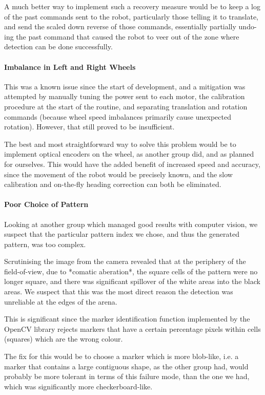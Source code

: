 \documentclass{article}
\begin{document}
A much better way to implement such a recovery measure would be to keep a log of the past commands sent to the robot, particularly those telling it to translate, and send the scaled down reverse of those commands, essentially partially undo-ing the past command that caused the robot to veer out of the zone where detection can be done successfully.

\paragraph{Imbalance in Left and Right Wheels}
This was a known issue since the start of development, and a mitigation was attempted by manually tuning the power sent to each motor, the calibration procedure at the start of the routine, and separating translation and rotation commands (because wheel speed imbalances primarily cause unexpected rotation). However, that still proved to be insufficient.

The best and most straightforward way to solve this problem would be to implement optical encoders on the wheel, as another group did, and as planned for ourselves. This would have the added benefit of increased speed and accuracy, since the movement of the robot would be precisely known, and the slow calibration and on-the-fly heading correction can both be eliminated.

\paragraph{Poor Choice of Pattern}
Looking at another group which managed good results with computer vision, we suspect that the particular pattern index we chose, and thus the generated pattern, was too complex.

Scrutinising the image from the camera revealed that at the periphery of the field-of-view, due to *comatic aberation*, the square cells of the pattern were no longer square, and there was significant spillover of the white areas into the black areas. We suspect that this was the most direct reason the detection was unreliable at the edges of the arena.

This is significant since the marker identification function implemented by the OpenCV library rejects markers that have a certain percentage pixels within cells (squares) which are the wrong colour.

The fix for this would be to choose a marker which is more blob-like, i.e. a marker that contains a large contiguous shape, as the other group had, would probably be more tolerant in terms of this failure mode, than the one we had, which was significantly more checkerboard-like.
\end{document}
